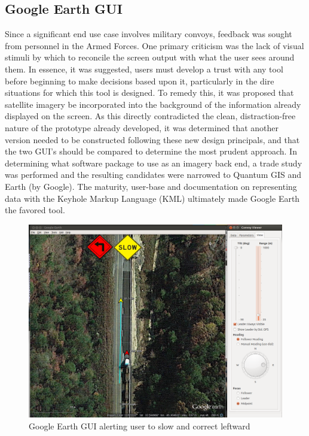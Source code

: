 \documentclass[twocolumn,10pt]{article}
\begin{document}
  \subsection*{Google Earth GUI}

    Since a significant end use case involves military convoys, feedback was sought from personnel in the Armed Forces.  One primary criticism was the lack of visual stimuli by which to reconcile the screen output with what the user sees around them.  In essence, it was suggested, users must develop a trust with any tool before beginning to make decisions based upon it, particularly in the dire situations for which this tool is designed.  To remedy this, it was proposed that satellite imagery be incorporated into the background of the information already displayed on the screen.  As this directly contradicted the clean, distraction-free nature of the prototype already developed, it was determined that another version needed to be constructed following these new design principals, and that the two GUI's should be compared to determine the most prudent approach.  In determining what software package to use as an imagery back end, a trade study was performed and the resulting candidates were narrowed to Quantum GIS and Earth (by Google).  The maturity, user-base and documentation on representing data with the Keyhole Markup Language (KML) ultimately made Google Earth the favored tool.

    \begin{figure}[ht] \centering
      \includegraphics[width=\columnwidth] {../graphics/earth_slow.png}
      \caption{Google Earth GUI alerting user to slow and correct leftward}
      \label{fig:earth_alerts}
    \end{figure}
\end{document}
